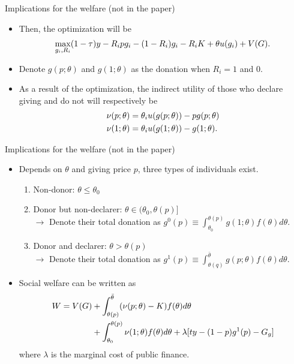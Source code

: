 \documentclass[dvipdfmx,10pt]{beamer}
\begin{document}
\begin{frame}{Implications for the welfare (not in the paper)}
	\begin{itemize}
	\item Then, the optimization will be
	\begin{align}
		\max_{g_i,R_i} (1-\tau)y-R_ipg_i-(1-R_i)g_i- R_iK +\theta u(g_i)+V(G).\notag
	\end{align}
	\item Denote $g(p;\theta)$ and $g(1; \theta)$ as the donation when $R_i=1$ and $0$.
	\item As a result of the optimization, the indirect utility of those who declare giving and do not will respectively be
	\begin{align}
		\nu(p;\theta)&=\theta_i u(g(p;\theta))-pg(p;\theta)\notag\\
		\nu(1;\theta)&=\theta_i u(g(1;\theta))-g(1;\theta)\notag.
	\end{align}
\end{itemize}
\end{frame}

\begin{frame}{Implications for the welfare (not in the paper)}
	\begin{itemize}
		\item Depends on $\theta$ and giving price $p$, three types of individuals exist.
		\begin{enumerate}
			\item Non-donor: $\theta\le \theta_0$
			\item Donor but non-declarer: $\theta\in(\theta_0,\theta(p)]$\\
			$\to$ Denote their total donation as $g^0(p)\equiv\int_{\theta_0}^{\theta(p)}g(1;\theta)f(\theta)d\theta$.
			\item Donor and declarer: $\theta>\theta(p)$\\
			$\to$ Denote their total donation as $g^1(p)\equiv\int_{\theta(q)}^{\bar{\theta}}g(p;\theta)f(\theta)d\theta$.
		\end{enumerate}
	\item Social welfare can be written as
	\begin{align}
		W=V(G)&+\int_{\theta(p)}^{\bar{\theta}}(\nu(p;\theta)-K)f(\theta)d\theta\notag\\
		&+\int_{\theta_0}^{\theta(p)}\nu(1;\theta)f(\theta)d\theta+\lambda[ty-(1-p)g^1(p)-G_g]\notag
	\end{align}
	where $\lambda$ is the marginal cost of public finance.
	\end{itemize}
\end{frame}
\end{document}

